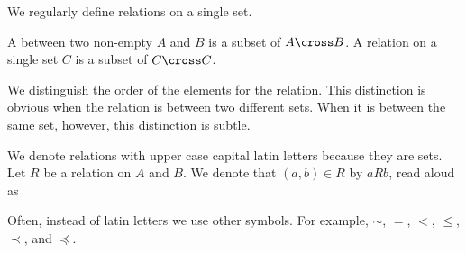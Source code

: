 
\sbasic




\sstart



We regularly define
relations on a single
set.


A
between two non-empty
$A$ and $B$ is a subset of
$A \cross B$.
A relation on a single set
$C$ is a subset of $C \cross C$.

We distinguish the order
of the elements for
the relation.
This distinction is obvious
when the relation is between
two different sets.
When it is between the same set,
however, this distinction
is subtle.

We denote relations with upper
case capital latin letters because
they are sets.
Let $R$ be a relation on $A$ and $B$.
We denote that $(a, b) \in R$ by
$a R b$, read aloud as

Often, instead of latin letters we use
other symbols.
For example,
$\sim$, $=$, $<$,
$\leq$, $\prec$, and $\preceq$.

\strats
